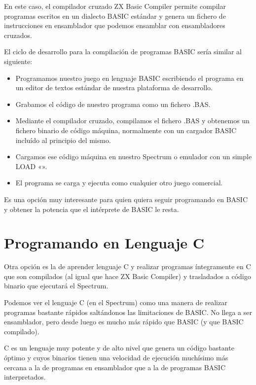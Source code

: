 \documentclass[letterpaper,10pt,spanish]{sphinxmanual}
\begin{document}
En este caso, el compilador cruzado ZX Basic Compiler permite compilar programas escritos en un dialecto BASIC estándar y genera un fichero de instrucciones en ensamblador que podemos ensamblar con ensambladores cruzados.

El ciclo de desarrollo para la compilación de programas BASIC sería similar al siguiente:
\begin{itemize}
\item {} 
Programamos nuestro juego en lenguaje BASIC escribiendo el programa en un editor de textos estándar de nuestra plataforma de desarrollo.

\item {} 
Grabamos el código de nuestro programa como un fichero .BAS.

\item {} 
Mediante el compilador cruzado, compilamos el fichero .BAS y obtenemos un fichero binario de código máquina, normalmente con un cargador BASIC incluído al principio del mismo.

\item {} 
Cargamos ese código máquina en nuestro Spectrum o emulador con un simple LOAD «».

\item {} 
El programa se carga y ejecuta como cualquier otro juego comercial.

\end{itemize}

Es una opción muy interesante para quien quiera seguir programando en BASIC y obtener la potencia que el intérprete de BASIC le resta.


\section{Programando en Lenguaje C}
\label{\detokenize{02_introduccion/introduccion:programando-en-lenguaje-c}}
Otra opción es la de aprender lenguaje C y realizar programas íntegramente en C que son compilados (al igual que hace ZX Basic Compiler) y trasladados a código binario que ejecutará el Spectrum.

Podemos ver el lenguaje C (en el Spectrum) como una manera de realizar programas bastante rápidos saltándonos las limitaciones de BASIC. No llega a ser ensamblador, pero desde luego es mucho más rápido que BASIC (y que BASIC compilado).

C es un lenguaje muy potente y de alto nivel que genera un código bastante óptimo y cuyos binarios tienen una velocidad de ejecución muchísimo más cercana a la de programas en ensamblador que a la de programas BASIC interpretados.
\end{document}
